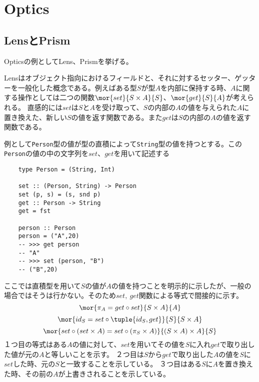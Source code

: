 \documentclass[uplatex,dvipdfmx]{jsarticle}
\newcommand{\pr}[1]{\colorbox[rgb]{0.9,0.9,0.9}{\lstinline{#1}}}
\begin{document}
  \section{Optics}
  \subsection{LensとPrism}
  Opticsの例としてLens、Prismを挙げる。

  Lensはオブジェクト指向におけるフィールドと、それに対するセッター、ゲッターを一般化した概念である。例えばある型$S$が型$A$を内部に保持する時、$A$に関する操作としては二つの関数$\mor{set}{S\times A}{S}$、$\mor{get}{S}{A}$が考えられる。
  直感的には$set$は$S$と$A$を受け取って、$S$の内部の$A$の値を与えられた$A$に置き換えた、新しい$S$の値を返す関数である。また$get$は$S$の内部の$A$の値を返す関数である。
  
  例として\pr{Person}型の値が型の直積によって\pr{String}型の値を持つとする。この\pr{Person}の値の中の文字列を$set$、$get$を用いて記述する
  \begin{lstlisting}
    type Person = (String, Int)

    set :: (Person, String) -> Person
    set (p, s) = (s, snd p)
    get :: Person -> String
    get = fst

    person :: Person
    person = ("A",20)
    -- >>> get person
    -- "A"
    -- >>> set (person, "B")
    -- ("B",20)
  \end{lstlisting}
  ここでは直積型を用いて$S$の値が$A$の値を持つことを明示的に示したが、一般の場合ではそうは行かない。そのため$set,\ get$関数による等式で間接的に示す。
  \[\mor{\pi_A = get\circ set}{S\times A}{A}\]
  \[\mor{id_S = set\circ\tuple{id_S,get}}{S}{S\times A}\]
  \[\mor{set\circ(set\times A) = set\circ (\pi_S\times A)}{(S\times A)\times A}{S}\]
  １つ目の等式はある$A$の値に対して、$set$を用いてその値を$S$に入れ$get$で取り出した値が元の$A$と等しいことを示す。
  ２つ目は$S$から$get$で取り出した$A$の値を$S$に$set$した時、元の$S$と一致することを示している。
  ３つ目はある$S$に$A$を置き換えた時、その前の$A$が上書きされることを示している。
\end{document}
